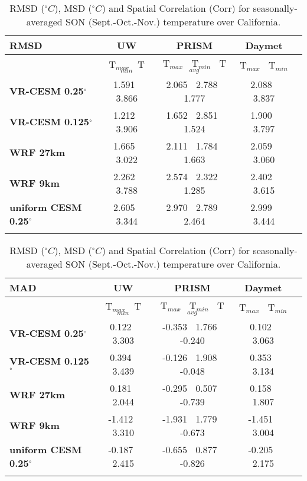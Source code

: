\documentclass[ms]{agutexSI}
\begin{document}
\begin{table}
\begin{center}
\caption{RMSD ($^\circ C$), MSD ($^\circ C$) and Spatial Correlation (Corr) for seasonally-averaged SON (Sept.-Oct.-Nov.) temperature over California.} 
\begin{tabular}{lcccc}
\hline \textbf{RMSD} & \textbf{UW}  & \textbf{PRISM} & \textbf{Daymet} \\
\hline $    $ & T$_{max}$ $\     $  T$_{min}$ & T$_{max}$ $\     $  T$_{min}$ $\     $ T$_{avg}$& T$_{max}$ $\     $  T$_{min}$\\
\hline \textbf{VR-CESM 0.25$^\circ$} & 1.591 $\ $ 3.866 & 2.065 $\ $ 2.788 $\ $ 1.777 & 2.088 $\ $ 3.837 \\
\textbf{VR-CESM 0.125$^\circ$} & 1.212 $\ $ 3.906 & 1.652 $\ $ 2.851 $\ $ 1.524 & 1.900 $\ $ 3.797 \\
\textbf{WRF 27km} & 1.665 $\ $ 3.022 & 2.111 $\ $ 1.784 $\ $ 1.663 & 2.059 $\ $ 3.060 \\
\textbf{WRF 9km} & 2.262 $\ $ 3.788 & 2.574 $\ $ 2.322 $\ $ 1.285 & 2.402 $\ $ 3.615 \\
\textbf{uniform CESM 0.25$^\circ$} & 2.605 $\ $ 3.344 & 2.970 $\ $ 2.789 $\ $ 2.464 & 2.999 $\ $ 3.444 \\
\hline
\\
\end{tabular}

\begin{tabular}{lcccc}
\hline \textbf{MAD} & \textbf{UW}  & \textbf{PRISM} & \textbf{Daymet} \\
\hline $    $ & T$_{max}$ $\     $  T$_{min}$ & T$_{max}$ $\     $  T$_{min}$ $\     $ T$_{avg}$& T$_{max}$ $\     $  T$_{min}$\\
\hline \textbf{VR-CESM 0.25$^\circ$} & 0.122 $\ $ 3.303 & -0.353 $\ $ 1.766 $\ $ -0.240 & 0.102 $\ $ 3.063 \\
\textbf{VR-CESM 0.125$^\circ$} & 0.394 $\ $ 3.439 & -0.126 $\ $ 1.908 $\ $ -0.048 & 0.353 $\ $ 3.134 \\
\textbf{WRF 27km} & 0.181 $\ $ 2.044 & -0.295 $\ $ 0.507 $\ $ -0.739 & 0.158 $\ $ 1.807 \\
\textbf{WRF 9km} & -1.412 $\ $ 3.310 & -1.931 $\ $ 1.779 $\ $ -0.673 & -1.451 $\ $ 3.004 \\
\textbf{uniform CESM 0.25$^\circ$} & -0.187 $\ $ 2.415 & -0.655 $\ $ 0.877 $\ $ -0.826 & -0.205 $\ $ 2.175 \\
\hline
\\
\end{tabular}


\end{center}
\end{table}
\end{document}
